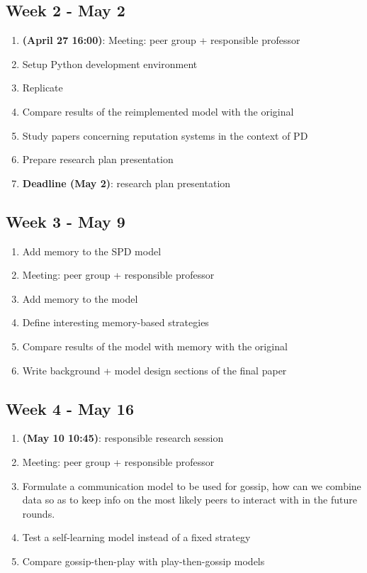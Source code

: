 \documentclass[english]{article}
\begin{document}
\subsection*{Week 2 - May 2}
\begin{enumerate}
\item \textbf{(April 27 16:00)}: Meeting: peer group + responsible professor
\item Setup Python development environment
\item Replicate \citet{smaldino}
\item Compare results of the reimplemented model with the original
\item Study papers concerning reputation systems in the context of PD \citep{simple-reputation,public-private-monitoring}
\item Prepare research plan presentation
\item \textbf{Deadline (May 2)}: research plan presentation
\end{enumerate}

\subsection*{Week 3 - May 9}
\begin{enumerate}
\item Add memory to the SPD model
\item Meeting: peer group + responsible professor
\item Add memory to the model
\item Define interesting memory-based strategies
\item Compare results of the model with memory with the original
\item Write background + model design sections of the final paper
\end{enumerate}

\subsection*{Week 4 - May 16}
\begin{enumerate}
\item \textbf{(May 10 10:45)}: responsible research session
\item Meeting: peer group + responsible professor
\item Formulate a communication model to be used for gossip, how can we combine data so as to keep info on the most likely peers to interact with in the future rounds.
\item Test a self-learning model instead of a fixed strategy
\item Compare gossip-then-play with play-then-gossip models
\end{enumerate}
\end{document}
